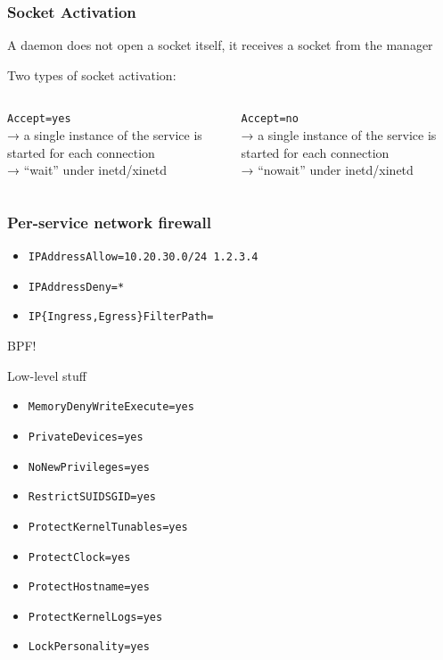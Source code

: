 \documentclass[serif]{beamer}
\begin{document}
\begin{frame}[c]
  \frametitle{Socket Activation}

  A daemon does not open a socket itself, it receives a socket from the manager

  \medskip
  \pause

  \centering
  Two types of socket activation:

  \medskip

  \begin{columns}
    \begin{column}{0.5\textwidth}
      \texttt{Accept=yes}\\
      → a single instance of the service is started for each connection\\
      → ``wait'' under inetd/xinetd
    \end{column}
    \begin{column}{0.5\textwidth}
      \texttt{Accept=no}\\
      → a single instance of the service is started for each connection\\
      → ``nowait'' under inetd/xinetd
    \end{column}
  \end{columns}
\end{frame}

\begin{frame}
  \frametitle{Per-service network firewall}

  \begin{itemize}
  \item \texttt{IPAddressAllow=\color{gray}10.20.30.0/24 1.2.3.4}
  \item \texttt{IPAddressDeny=\color{gray}*}
  \item \texttt{IP\{Ingress,Egress\}FilterPath=}
  \end{itemize}

  \bigskip

  BPF!
\end{frame}

\begin{frame}[c]
  \Huge{Low-level stuff}
\end{frame}

\begin{frame}
  \begin{itemize}
  \item \texttt{MemoryDenyWriteExecute=yes}
  \item \texttt{PrivateDevices=yes}
  \item \texttt{NoNewPrivileges=yes}
  \item \texttt{RestrictSUIDSGID=yes}
  \item \texttt{ProtectKernelTunables=yes}
  \item \texttt{ProtectClock=yes}
  \item \texttt{ProtectHostname=yes}
  \item \texttt{ProtectKernelLogs=yes}
  \item \texttt{LockPersonality=yes}
  \end{itemize}
\end{frame}
\end{document}
